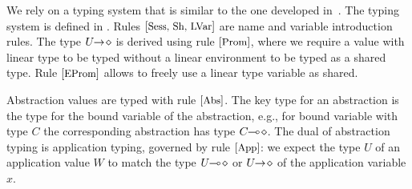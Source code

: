 %

\noi We rely on a typing system that is similar to the one developed in~\cite{tlca07,MostrousY15}. 
The typing system is defined in .
Rules ${\footnotesize[\textrm{\small Sess, Sh, LVar}]}$ are name and variable introduction rules. 
The type $U\!\! \rightarrow\! \diamond$ %
is derived using rule ${\footnotesize[\textrm{\small Prom}]}$, where we require
a value with linear type to be typed without a linear
environment to be typed as a shared type.
Rule ${\footnotesize[\textrm{\small EProm}]}$ allows to freely use a linear
type variable as shared.

Abstraction values are typed with rule ${\footnotesize[\textrm{\small Abs}]}$.
The key type for an abstraction is the type for
the bound variable of the abstraction, e.g., for
bound variable with type $C$ the corresponding abstraction has type $C\!\! \multimap\! \diamond$.
The dual of abstraction typing is application typing,
governed by rule ${\footnotesize[\textrm{\small App}]}$: we expect
the type $U$ of an application value $W$ 
to match the type $U\!\! \multimap\! \diamond$ or $U\!\! \rightarrow\! \diamond$
of the application variable $x$.

